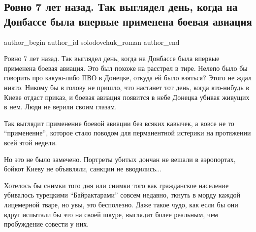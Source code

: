  
 
 
 
 
 
\subsection{Ровно 7 лет назад. Так выглядел день, когда на Донбассе была впервые применена боевая авиация}
\label{sec:27_05_2021.fb.solodovchuk_roman.1.aviacia_vojna_donbass}
\ifcmt
 author_begin
   author_id solodovchuk_roman
 author_end
\fi

Ровно 7 лет назад. Так выглядел день, когда на Донбассе была впервые применена
боевая авиация. Это был похоже на расстрел в тире. Нелепо было бы говорить про
какую-либо ПВО в Донецке, откуда ей было взяться? Этого не ждал никто. Никому
бы в голову не пришло, что настанет тот день, когда кто-нибудь в Киеве отдаст
приказ, и боевая авиация появится в небе Донецка убивая живущих в нем. Люди не
верили своим глазам. 

Так выглядит применение боевой авиации без всяких кавычек, а вовсе не то
\enquote{применение}, которое стало поводом для перманентной истерики на протяжении
всей этой недели. 

Но это не было замечено. Портреты убитых дончан не вешали в аэропортах, бойкот
Киеву не объявляли, санкции не вводились... 

Хотелось бы снимки того дня или снимки того как гражданское население убивалось
турецкими \enquote{Байрактарами} совсем недавно, ткнуть в морду каждой лицемерной
тваре, но увы, это бесполезно. Даже такое чудо, как если бы они вдруг испытали
бы это на своей шкуре, выглядит более реальным, чем пробуждение совести у них.

